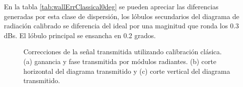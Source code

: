 En la tabla \ref{tab:wallErrClassical0deg} se pueden apreciar las diferencias generadas por esta clase de dispersión, los 
lóbulos secundarios del diagrama de radiación calibrado se diferencia del ideal por una maginitud que ronda los 0.3 dBs. El 
lóbulo principal se ensancha en 0.2 grados.

\begin{figure}[H]
	\centering

	\caption{Correcciones de la señal transmitida utilizando calibración clásica. (a) ganancia y fase transmitida por módulos
		radiantes. (b) corte horizontal del diagrama transmitido y (c) corte vertical del diagrama transmitido.}
	\label{fig:wallErrClassical0deg}
\end{figure}

